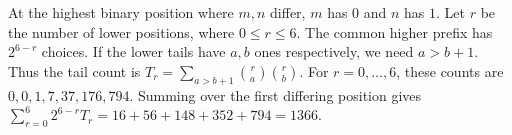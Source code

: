 At the highest binary position where $m,n$ differ, $m$ has $0$ and $n$ has $1$. Let $r$ be the number of lower positions, where $0\le r\le6$. The common higher prefix has $2^{6-r}$ choices. If the lower tails have $a,b$ ones respectively, we need $a>b+1$. Thus the tail count is $T_r=\sum_{a>b+1}\binom ra\binom rb$. For $r=0,\ldots,6$, these counts are $0,0,1,7,37,176,794$. Summing over the first differing position gives $\sum_{r=0}^6 2^{6-r}T_r=16+56+148+352+794=\boxed{1366}$.
